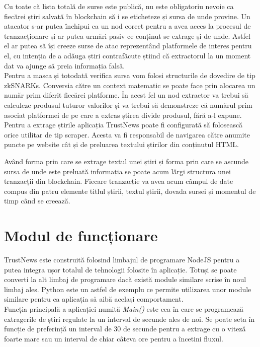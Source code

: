 \clearpage

Cu toate că lista totală de surse este publică, nu este obligatoriu nevoie ca fiecărei știri salvată în blockchain să i se eticheteze și sursa de unde provine. Un atacator s-ar putea închipui ca un nod corect pentru a avea acces la procesul de tranzacționare și ar putea urmări pasiv ce conținut se extrage și de unde. Astfel el ar putea să își creeze surse de atac reprezentând platformele de interes pentru el, cu intenția de a adăuga știri contrafăcute știind că extractorul la un moment dat va ajunge să preia informația falsă.\\

Pentru a masca și totodată verifica sursa vom folosi structurile de dovedire de tip zkSNARKs. Conversia către un context matematic se poate face prin alocarea un număr prim diferit fiecărei platforme. În acest fel un nod extractor va trebui să calculeze produsul tuturor valorilor și va trebui să demonstreze că numărul prim asociat platformei de pe care a extras știrea divide produsul, fără a-l expune.\\

Pentru a extrage știrile aplicația TrustNews poate fi configurată să folosească orice utilitar de tip scraper. Acesta va fi responsabil de navigarea către anumite puncte pe website cât și de preluarea textului știrilor din conținutul HTML. 

Având forma prin care se extrage textul unei știri și forma prin care se ascunde sursa de unde este preluată informația se poate acum lărgi structura unei tranzacții din blockchain. Fiecare tranzacție va avea acum câmpul de date compus din patru elemente titlul știrii, textul știrii, dovada sursei și momentul de timp când se creează. \\

\clearpage

\section{Modul de funcționare}

TrustNews este construită folosind limbajul de programare NodeJS pentru a putea integra ușor totalul de tehnologii folosite în aplicație. Totuși se poate converti la alt limbaj de programare dacă există module similare scrise în noul limbaj ales. Python este un astfel de exemplu ce permite utilizarea unor module similare pentru ca aplicația să aibă același comportament. \\

Funcția principală a aplicației numită \textit{Main()} \cite{TrustNews_Main} este cea în care se programează extragerile de știri regulate la un interval de secunde ales de noi. Se poate seta în funcție de preferință un interval de 30 de secunde pentru a extrage cu o viteză foarte mare sau un interval de chiar câteva ore pentru a încetini fluxul.\\

